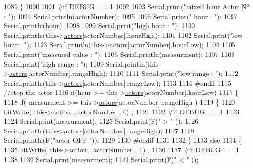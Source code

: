 \begin{DoxyCode}
1089 \{
1090 
1091 \textcolor{preprocessor}{#if DEBUG == 1}
1092     
1093     Serial.print(\textcolor{stringliteral}{"mixed hour Actor N° : "});
1094     Serial.println(actorNumber);
1095 
1096     Serial.print(\textcolor{stringliteral}{" hour : "});
1097     Serial.println(hour);
1098 
1099     Serial.print(\textcolor{stringliteral}{"high hour : "});
1100     Serial.println(this->\hyperlink{class_jetpack_a7e16d2f97837f9712a2e6de1c50d99db}{actors}[actorNumber].hourHigh);
1101 
1102     Serial.print(\textcolor{stringliteral}{"low hour : "});
1103     Serial.println(this->\hyperlink{class_jetpack_a7e16d2f97837f9712a2e6de1c50d99db}{actors}[actorNumber].hourLow);
1104 
1105     Serial.print(\textcolor{stringliteral}{"measured value : "});
1106     Serial.println(measurment);
1107 
1108     Serial.print(\textcolor{stringliteral}{"high range : "});
1109     Serial.println(this->\hyperlink{class_jetpack_a7e16d2f97837f9712a2e6de1c50d99db}{actors}[actorNumber].rangeHigh);
1110 
1111     Serial.print(\textcolor{stringliteral}{"low range : "});
1112     Serial.println(this->\hyperlink{class_jetpack_a7e16d2f97837f9712a2e6de1c50d99db}{actors}[actorNumber].rangeLow);
1113 
1114 \textcolor{preprocessor}{#endif}
1115     \textcolor{comment}{//stop the actor    }
1116     \textcolor{keywordflow}{if}(hour >= this->\hyperlink{class_jetpack_a7e16d2f97837f9712a2e6de1c50d99db}{actors}[actorNumber].hourLow)
1117     \{
1118             \textcolor{keywordflow}{if}( measurment >= this->\hyperlink{class_jetpack_a7e16d2f97837f9712a2e6de1c50d99db}{actors}[actorNumber].rangeHigh )
1119             \{
1120                 bitWrite( this->\hyperlink{class_jetpack_aca3142925a7b0834b34ae91d26af7765}{action} , actorNumber , 0) ;
1121 
1122 \textcolor{preprocessor}{            #if DEBUG == 1 }
1123 
1124                 Serial.print(measurment);
1125                 Serial.print(F(\textcolor{stringliteral}{" > "} ));
1126                 Serial.println(this->\hyperlink{class_jetpack_a7e16d2f97837f9712a2e6de1c50d99db}{actors}[actorNumber].rangeHigh);
1127 
1128                 Serial.println(F(\textcolor{stringliteral}{"actor OFF "}));
1129 
1130 \textcolor{preprocessor}{            #endif  }
1131 
1132             \}
1133             \textcolor{keywordflow}{else} 
1134             \{
1135                 bitWrite( this->\hyperlink{class_jetpack_aca3142925a7b0834b34ae91d26af7765}{action} , actorNumber , 1) ;
1136 
1137 \textcolor{preprocessor}{            #if DEBUG == 1 }
1138 
1139                 Serial.print(measurment);
1140                 Serial.print(F(\textcolor{stringliteral}{" < "} ));

\end{DoxyCode}
